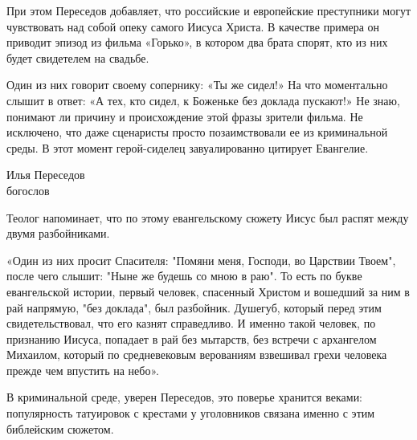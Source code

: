 При этом Переседов добавляет, что российские и европейские преступники могут чувствовать над собой опеку самого Иисуса Христа. В качестве примера он приводит эпизод из фильма «Горько», в котором два брата спорят, кто из них будет свидетелем на свадьбе.

\begin{fancyquotes}
    Один из них говорит своему сопернику: «Ты же сидел!» На что моментально слышит в ответ: «А тех, кто сидел, к Боженьке без доклада пускают!» Не знаю, понимают ли причину и происхождение этой фразы зрители фильма. Не исключено, что даже сценаристы просто позаимствовали ее из криминальной среды. В этот момент герой-сиделец завуалированно цитирует Евангелие.\\

    \begin{flushright}
        Илья Переседов\\
        богослов
    \end{flushright}
\end{fancyquotes}

Теолог напоминает, что по этому евангельскому сюжету Иисус был распят между двумя разбойниками.

«Один из них просит Спасителя: "Помяни меня, Господи, во Царствии Твоем", после чего слышит: "Ныне же будешь со мною в раю". То есть по букве евангельской истории, первый человек, спасенный Христом и вошедший за ним в рай напрямую, "без доклада", был разбойник. Душегуб, который перед этим свидетельствовал, что его казнят справедливо. И именно такой человек, по признанию Иисуса, попадает в рай без мытарств, без встречи с архангелом Михаилом, который по средневековым верованиям взвешивал грехи человека прежде чем впустить на небо».

В криминальной среде, уверен Переседов, это поверье хранится веками: популярность татуировок с крестами у уголовников связана именно с этим библейским сюжетом.

